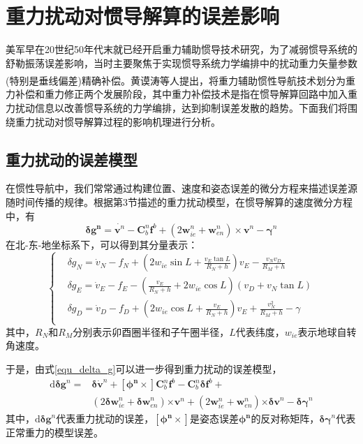 \documentclass[12pt,a4,utf8]{article}
\newcommand{\upcite}[1]{\textsuperscript{\textsuperscript{\cite{#1}}}} %
\begin{document}
\section{重力扰动对惯导解算的误差影响}
美军早在20世纪50年代末就已经开启重力辅助惯导技术研究，为了减弱惯导系统的舒勒振荡误差影响，当时主要聚焦于实现惯导系统力学编排中的扰动重力矢量参数(特别是垂线偏差)精确补偿。黄谟涛等人提出\upcite{WHCH20240724001}，将重力辅助惯性导航技术划分为重力补偿和重力修正两个发展阶段，其中重力补偿技术是指在惯导解算回路中加入重力扰动信息以改善惯导系统的力学编排，达到抑制误差发散的趋势。下面我们将围绕重力扰动对惯导解算过程的影响机理进行分析。

\subsection{重力扰动的误差模型}
在惯性导航中，我们常常通过构建位置、速度和姿态误差的微分方程来描述误差源随时间传播的规律。根据第3节描述的重力扰动模型，在惯导解算的速度微分方程中，有
\begin{equation}
      \bm{\delta g^n} = \dot{\bm{v}^n}-\bm{C}^n_b\bm{f}^b+(2\bm{w}^n_{ie}+\bm{w}^n_{en})\times \bm{v}^n- \bm{\gamma}^n
      \label{equ_delta_g}
\end{equation}
在北-东-地坐标系下，可以得到其分量表示：
\begin{equation}
      \left\{ \begin{aligned}
      & \delta {{g}_{N}}={{{\dot{v}}}_{N}}-{{f}_{N}}+(2{{w}_{ie}}\sin L+\frac{{{v}_{E}}\tan L}{{{R}_{N}}+h}){{v}_{E}}-\frac{{{v}_{N}}{{v}_{D}}}{{{R}_{M}}+h} \\ 
      & \delta {{g}_{E}}={{{\dot{v}}}_{E}}-{{f}_{E}}-(\frac{{{v}_{E}}}{{{R}_{N}}+h}+2{{w}_{ie}}\cos L)({{v}_{D}}+{{v}_{N}}\tan L) \\ 
      & \delta {{g}_{D}}={{{\dot{v}}}_{D}}-{{f}_{D}}+(2{{w}_{ie}}\cos L+\frac{{{v}_{E}}}{{{R}_{N}}+h}){{v}_{E}}+\frac{v_{N}^{2}}{{{R}_{M}}+h}-\gamma  \\ 
\end{aligned} \right.
\label{equ_delta_g_more}
\end{equation}
其中，$R_N$和$R_M$分别表示卯酉圈半径和子午圈半径，$L$代表纬度，$w_{ie}$表示地球自转角速度。

于是，由式\ref{equ_delta_g}可以进一步得到重力扰动的误差模型，
\begin{equation}
      \begin{aligned}
      \text{d}\bm{\delta g}^n = &\bm{\delta} \dot{\bm{v}}^n + \bm{[\phi^n\times]}\bm{C}^n_b \bm{f}^b - \bm{C}^n_b \bm{\delta f}^b + 
      \\
      &(2\bm{\delta w}^n_{ie} +\bm{\delta w}^n_{en})\bm{\times v}^n+(2\bm{w}^n_{ie} + \bm{w}^n_{en})\bm{\times \delta v}^n - \bm{\delta \gamma}^n
      \end{aligned}
      \label{equ_diff_disturb}
\end{equation}
其中，$\text{d}\bm{\delta g}^n$代表重力扰动的误差，$\bm{[\phi^n \times]}$是姿态误差$\bm{\phi^n}$的反对称矩阵，$\bm{\delta \gamma}^n$代表正常重力的模型误差。
\end{document}
